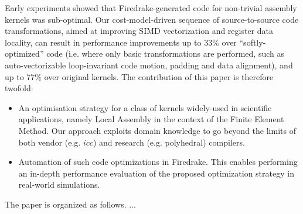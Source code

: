 \documentclass[conference]{IEEEtran}
\begin{document}
Early experiments showed that Firedrake-generated code for non-trivial assembly kernels was sub-optimal. Our cost-model-driven sequence of source-to-source code transformations, aimed at improving SIMD vectorization and register data locality, can result in performance improvements up to 33$\%$ over ``softly-optimized'' code (i.e. where only basic transformations are performed, such as auto-vectorizable loop-invariant code motion, padding and data alignment), and up to 77$\%$ over original kernels. The contribution of this paper is therefore twofold:
\begin{itemize}
\item An optimisation strategy for a class of kernels widely-used in scientific applications, namely Local Assembly in the context of the Finite Element Method. Our approach exploits domain knowledge to go beyond the limits of both vendor (e.g. $icc$) and research (e.g. polyhedral) compilers.
\item Automation of such code optimizations in Firedrake. This enables performing an in-depth performance evaluation of the proposed optimization strategy in real-world simulations.
\end{itemize}

The paper is organized as follows. ...


\end{document}
